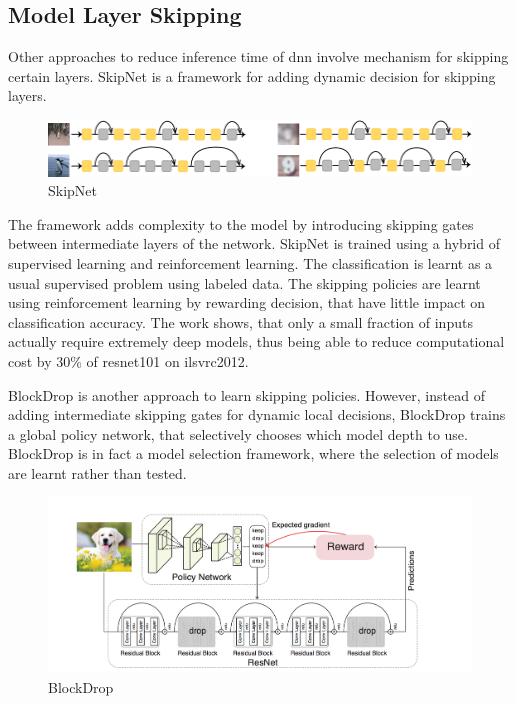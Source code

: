 \subsection{Model Layer Skipping}

Other approaches to reduce inference time of \gls{dnn} involve mechanism for skipping certain layers. SkipNet \cite{wang_skipnet:_2017} is a framework for adding dynamic decision for skipping layers. 

\begin{figure}
	\centering
	\includegraphics[width=\linewidth]{figures/models/skipnet}
	\caption[SkipNet]{SkipNet}
\end{figure}

The framework adds complexity to the model by introducing skipping gates between intermediate layers of the network. SkipNet is trained using a hybrid of supervised learning and reinforcement learning. The classification is learnt as a usual supervised problem using labeled data. The skipping policies are learnt using reinforcement learning by rewarding decision, that have little impact on classification accuracy. The work shows, that only a small fraction of inputs actually require extremely deep models, thus being able to reduce computational cost by 30\% of \gls{resnet}101 on \gls{ilsvrc2012}. 

BlockDrop \cite{wu_blockdrop:_2017} is another approach to learn skipping policies. However, instead of adding intermediate skipping gates for dynamic local decisions, BlockDrop trains a global policy network, that selectively chooses which model depth to use. BlockDrop is in fact a model selection framework, where the selection of models are learnt rather than tested. 

\begin{figure}
	\centering
	\includegraphics[width=\linewidth]{figures/models/blockdrop}
	\caption[BlockDrop]{BlockDrop}
\end{figure}

